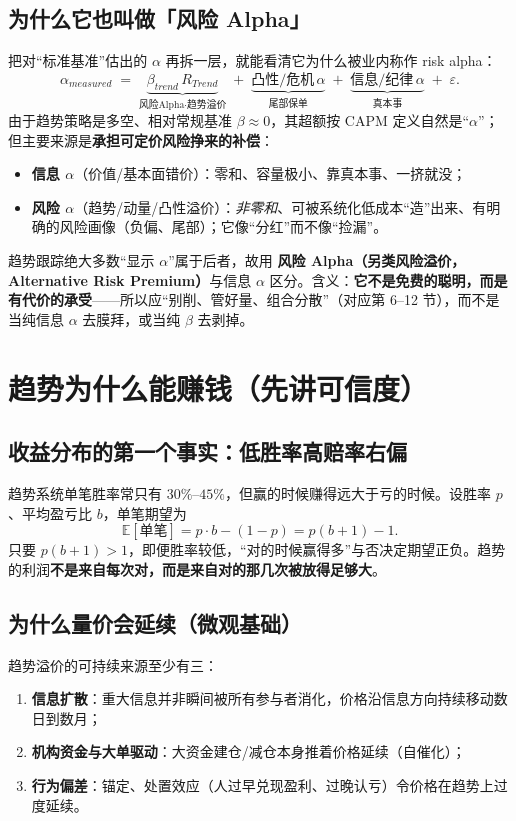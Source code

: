 \documentclass[UTF8,11pt]{ctexart}
\begin{document}
\subsection{为什么它也叫做「风险 Alpha」}
把对“标准基准”估出的 $\alpha$ 再拆一层，就能看清它为什么被业内称作 risk alpha：
\begin{equation}
\alpha_{measured} \;=\; \underbrace{\beta_{trend}\,R_{Trend}}_{\text{风险Alpha·趋势溢价}}
\;+\; \underbrace{\text{凸性/危机}\,\alpha}_{\text{尾部保单}}
\;+\; \underbrace{\text{信息/纪律}\,\alpha}_{\text{真本事}} \;+\; \varepsilon .
\end{equation}
由于趋势策略是多空、相对常规基准 $\beta\approx0$，其超额按 CAPM 定义自然是“$\alpha$”；但主要来源是\textbf{承担可定价风险挣来的补偿}：
\begin{itemize}[itemsep=2pt]
\item \textbf{信息 $\alpha$}（价值/基本面错价）：零和、容量极小、靠真本事、一挤就没；
\item \textbf{风险 $\alpha$}（趋势/动量/凸性溢价）：\emph{非零和}、可被系统化低成本“造”出来、有明确的风险画像（负偏、尾部）；它像“分红”而不像“捡漏”。
\end{itemize}
趋势跟踪绝大多数“显示 $\alpha$”属于后者，故用 \textbf{风险 Alpha（另类风险溢价，Alternative Risk Premium）}与信息 $\alpha$ 区分。含义：\textbf{它不是免费的聪明，而是有代价的承受}——所以应“别削、管好量、组合分散”（对应第 6--12 节），而不是当纯信息 $\alpha$ 去膜拜，或当纯 $\beta$ 去剥掉。

\section{趋势为什么能赚钱（先讲可信度）}
\subsection{收益分布的第一个事实：低胜率高赔率右偏}
趋势系统单笔胜率常只有 $30\%$--$45\%$，但赢的时候赚得远大于亏的时候。设胜率 $p$、平均盈亏比 $b$，单笔期望为
\begin{equation}
\mathbb{E}[\text{单笔}] = p\cdot b - (1-p) = p(b+1)-1 .
\end{equation}
只要 $p(b+1)>1$，即便胜率较低，“对的时候赢得多”与否决定期望正负。趋势的利润\textbf{不是来自每次对，而是来自对的那几次被放得足够大}。
\subsection{为什么量价会延续（微观基础）}
趋势溢价的可持续来源至少有三：
\begin{enumerate}[itemsep=2pt]
\item \textbf{信息扩散}：重大信息并非瞬间被所有参与者消化，价格沿信息方向持续移动数日到数月；
\item \textbf{机构资金与大单驱动}：大资金建仓/减仓本身推着价格延续（自催化）；
\item \textbf{行为偏差}：锚定、处置效应（人过早兑现盈利、过晚认亏）令价格在趋势上过度延续。
\end{enumerate}
\end{document}
